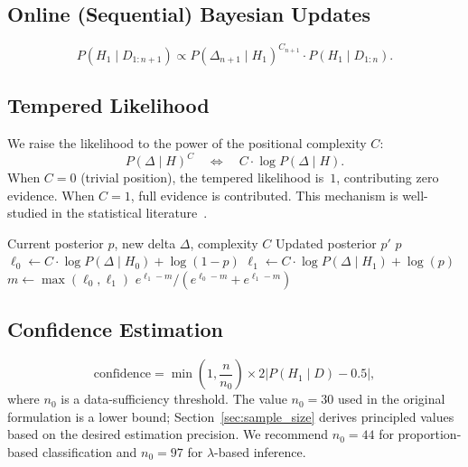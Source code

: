 \documentclass[11pt,a4paper]{article}
\begin{document}
\subsection{Online (Sequential) Bayesian Updates}

\begin{equation}
    P(H_1 \mid D_{1:n+1}) \propto P(\Delta_{n+1} \mid H_1)^{C_{n+1}} \cdot
    P(H_1 \mid D_{1:n}).
\end{equation}

\subsection{Tempered Likelihood}
\label{sec:tempered}

We raise the likelihood to the power of the positional complexity $C$:
\begin{equation}
    \label{eq:tempering}
    P(\Delta \mid H)^{C} \quad \Longleftrightarrow \quad
    C \cdot \log P(\Delta \mid H).
\end{equation}
When $C = 0$ (trivial position), the tempered likelihood is~$1$, contributing
zero evidence. When $C = 1$, full evidence is contributed. This mechanism
is well-studied in the statistical literature~\citep{grunwald2017inconsistency}.

\begin{algorithm}[H]
\caption{Online Bayesian Update with Tempered Likelihood}
\label{alg:online_update}
\begin{algorithmic}[1]
\Require Current posterior $p$, new delta $\Delta$, complexity $C$
\Ensure Updated posterior $p'$
    \State \Return $p$
\EndIf
\State $\ell_0 \gets C \cdot \log P(\Delta \mid H_0) + \log(1 - p)$
\State $\ell_1 \gets C \cdot \log P(\Delta \mid H_1) + \log(p)$
\State $m \gets \max(\ell_0, \ell_1)$
\State \Return $e^{\ell_1 - m} / (e^{\ell_0 - m} + e^{\ell_1 - m})$
\end{algorithmic}
\end{algorithm}

\subsection{Confidence Estimation}

\begin{equation}
    \text{confidence} = \min\!\left(1, \frac{n}{n_0}\right)
    \times 2 \left|P(H_1 \mid D) - 0.5\right|,
    \label{eq:confidence}
\end{equation}
where $n_0$ is a data-sufficiency threshold. The value $n_0 = 30$ used in
the original formulation is a lower bound; Section~\ref{sec:sample_size}
derives principled values based on the desired estimation precision. We
recommend $n_0 = 44$ for proportion-based classification and $n_0 = 97$
for $\lambda$-based inference.
\end{document}
